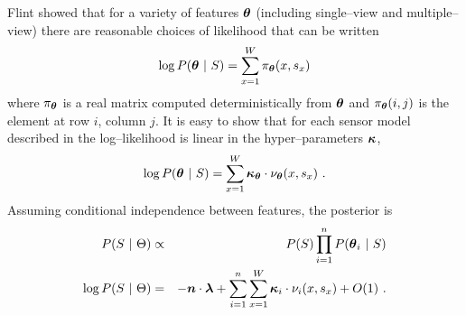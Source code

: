 Flint \etal \cite{Flint11} showed that for a variety of features
$\boldsymbol{\theta}$ (including single--view and multiple--view) there are
reasonable choices of likelihood that can be written
\begin{equation}
  \log P(\boldsymbol{\theta} ~|~ S) = \sum_{x=1}^W 
  \pi_{\boldsymbol{\theta}}(x,s_x)
  \label{eq:likelihood}
\end{equation}
where $\pi_{\boldsymbol{\theta}}$ is a real matrix computed
deterministically from $\boldsymbol{\theta}$ and $\pi_{\boldsymbol{\theta}}(i,j)$
is the element at row $i$, column $j$. It is easy to show that for each
sensor model described in \cite{Flint11} the log--likelihood is linear
in the hyper--parameters $\boldsymbol{\kappa}$, \ie
\begin{equation}
  \log P(\boldsymbol{\theta} ~|~ S) = 
  \sum_{x=1}^W
  \boldsymbol{\kappa}_{\boldsymbol{\theta}} 
  \cdot
  \nu_{\boldsymbol{\theta}}(x,s_x) ~.
\end{equation}
Assuming conditional independence between features, the posterior is
\begin{eqnarray}
    P(S ~|~ \Theta)
  &\propto&
    P(S) \prod_{i=1}^n P(\boldsymbol{\theta}_i ~|~ S)\\
    \log P(S ~|~ \Theta)
  &=&
    - \boldsymbol{n} \cdot \boldsymbol{\lambda}
    + \sum_{i=1}^n \sum_{x=1}^W 
    \boldsymbol{\kappa}_i \cdot \nu_i(x,s_x)
    + O(1) ~.
  \label{eq:log-posterior}
\end{eqnarray}

